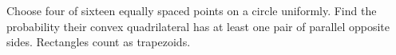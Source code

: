 Choose four of sixteen equally spaced points on a circle uniformly. Find the probability their convex quadrilateral has at least one pair of parallel opposite sides. Rectangles count as trapezoids.
